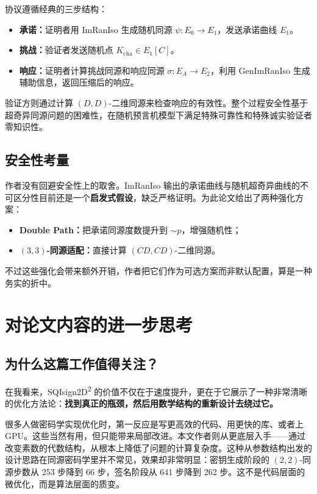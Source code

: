 \documentclass[12pt,a4paper]{ctexart}
\begin{document}
协议遵循经典的三步结构：
\begin{itemize}
    \item \textbf{承诺：}证明者用 ImRanIso 生成随机同源 $\psi: E_0 \to E_1$，发送承诺曲线 $E_1$。
    \item \textbf{挑战：}验证者发送随机点 $K_{\text{cha}} \in E_1[C]$。
    \item \textbf{响应：}证明者计算挑战同源和响应同源 $\sigma: E_A \to E_2$，利用 GenImRanIso 生成辅助信息，返回压缩后的响应。
\end{itemize}

验证方则通过计算 $(D, D)$-二维同源来检查响应的有效性。整个过程安全性基于超奇异同源问题的困难性，在随机预言机模型下满足特殊可靠性和特殊诚实验证者零知识性。

\subsection{安全性考量}

作者没有回避安全性上的取舍。ImRanIso 输出的承诺曲线与随机超奇异曲线的不可区分性目前还是一个\textbf{启发式假设}，缺乏严格证明。为此论文给出了两种强化方案：
\begin{itemize}
    \item \textbf{Double Path：}把承诺同源度数提升到 $\sim p$，增强随机性；
    \item \textbf{$(3,3)$-同源适配：}直接计算 $(CD, CD)$-二维同源。
\end{itemize}

不过这些强化会带来额外开销，作者把它们作为可选方案而非默认配置，算是一种务实的折中。

\section{对论文内容的进一步思考}

\subsection{为什么这篇工作值得关注？}

在我看来，SQIsign2D\textsuperscript{2} 的价值不仅在于速度提升，更在于它展示了一种非常清晰的优化方法论：\textbf{找到真正的瓶颈，然后用数学结构的重新设计去绕过它。}

很多人做密码学实现优化时，第一反应是写更高效的代码、用更快的库、或者上 GPU。这些当然有用，但只能带来局部改进。本文作者则从更底层入手——通过改变素数的代数结构，从根本上降低了问题的计算复杂度。这种从参数结构出发的设计思路在同源密码学里并不常见，效果却非常明显：密钥生成阶段的 $(2,2)$-同源步数从 253 步降到 66 步，签名阶段从 641 步降到 262 步。这不是代码层面的微优化，而是算法层面的质变。
\end{document}

